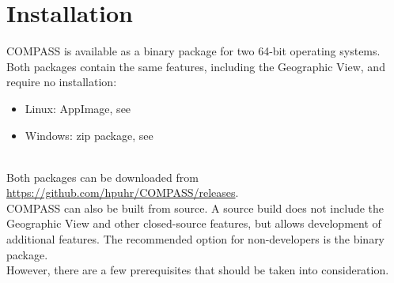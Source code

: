 \chapter{Installation}
\label{sec:installation}

COMPASS is available as a binary package for two 64-bit operating systems. Both packages contain the same features, including the Geographic View, and require no installation:

\begin{itemize}
\item Linux: AppImage, see 
\item Windows: zip package, see 
\end{itemize}
\ \\

Both packages can be downloaded from \url{https://github.com/hpuhr/COMPASS/releases}. \\

COMPASS can also be built from source. A source build does not include the Geographic View and other closed-source features, but allows development of additional features. The recommended option for non-developers is the binary package. \\

However, there are a few prerequisites that should be taken into consideration.











